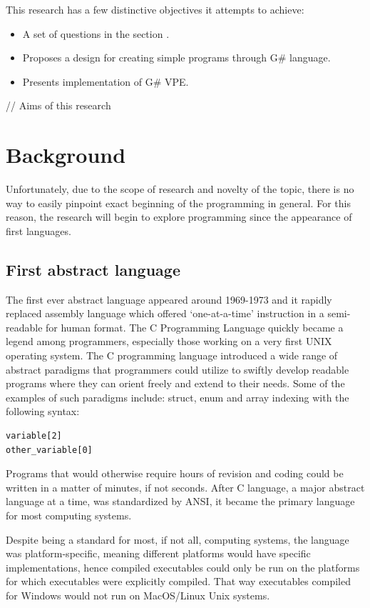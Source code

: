 \documentclass{article}
\begin{document}
This research has a few distinctive objectives it attempts to achieve:
\begin{itemize}
    \item A set of questions in the section .
    \item Proposes a design for creating simple programs through G\# language.
    \item Presents implementation of G\# VPE.
\end{itemize}

// Aims of this research




\section{Background}
Unfortunately, due to the scope of research and novelty of the topic, there is no way to easily pinpoint exact beginning of the programming in general. For this reason, the research will begin to explore programming since the appearance of first languages.

\subsection{First abstract language}
The first ever abstract language appeared around 1969-1973 and it rapidly replaced assembly language which offered ‘one-at-a-time’ instruction in a semi-readable for human format. The C Programming Language quickly became a legend among programmers, especially those working on a very first UNIX operating system\citep{ritche_clang}.
The C programming language introduced a wide range of abstract paradigms that programmers could utilize to swiftly develop readable programs where they can orient freely and extend to their needs. Some of the examples of such paradigms include: struct, enum and array indexing with the following syntax:

\begin{lstlisting}[caption=C array indexing]
variable[2]
other_variable[0]
\end{lstlisting}

Programs that would otherwise require hours of revision and coding could be written in a matter of minutes, if not seconds. After C language, a major abstract language at a time, was standardized by ANSI, it became the primary language for most computing systems.  

Despite being a standard for most, if not all, computing systems, the language was platform-specific, meaning different platforms would have specific implementations, hence compiled executables could only be run on the platforms for which executables were explicitly compiled. That way executables compiled for Windows would not run on MacOS/Linux Unix systems.
\end{document}
